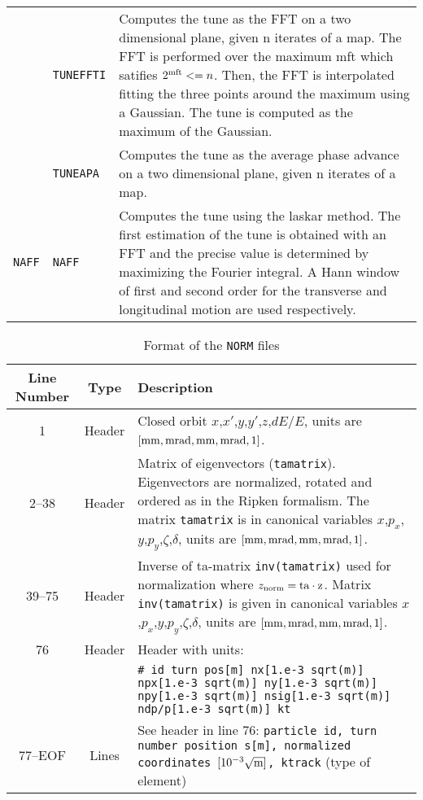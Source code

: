\begin{table}[H]
\begin{center}
\begin{tabularx}{\textwidth}{|l|l|X|}
    \cline{2-3}
    & \texttt{TUNEFFTI} & Computes the tune as the FFT on a two dimensional plane, given n iterates of a map. The FFT is performed over the maximum mft which satifies $2^{\rm mft} <= n$. Then, the FFT is interpolated fitting the three points around the maximum using a Gaussian. The tune is computed as the maximum of the Gaussian.\\
    \cline{2-3}
    & \texttt{TUNEAPA} & Computes the tune as the average phase advance on a two dimensional plane, given n iterates of a map. \\
    \hline
    \texttt{NAFF} \cite{NAFFpaper, NAFFpaper2}
    & \texttt{NAFF} & Computes the tune using the laskar method. The first estimation of the tune is obtained with an FFT and the precise value is determined by maximizing the Fourier integral. A Hann window of first and second order for the transverse and longitudinal motion are used respectively\index{NAFF}. \\
    \hline
    \end{tabularx}
\end{center}
\end{table}

\begin{table}[H]
\begin{center}
    \caption{Format of the \texttt{NORM} files}\label{fma:tab:2}
    \begin{tabularx}{\textwidth}{|c|c|X|}
        \hline
        \rowcolor{blue!30}
        \textbf{Line Number} & \textbf{Type} & \textbf{Description} \\
        \hline
        1 & Header & Closed orbit  $x$,$x'$,$y$,$y'$,$z$,$dE/E$, units are $[\rm mm,mrad,mm,mrad,1]$. \\
        \hline
        2--38 & Header & Matrix of eigenvectors (\texttt{tamatrix}). Eigenvectors are normalized, rotated and ordered as in the Ripken formalism. The matrix \texttt{tamatrix} is in canonical variables $x$,$p_x$,$y$,$p_y$,$\zeta$,$\delta$, units are $[\rm mm,mrad,mm,mrad,1]$. \\
        \hline
        39--75 & Header & Inverse of ta-matrix \texttt{inv(tamatrix)} used for normalization where \hbox{$z_{\rm norm}=\rm{ta}\cdot z$}. Matrix \texttt{inv(tamatrix)} is given in canonical variables $x$,$p_x$,$y$,$p_y$,$\zeta$,$\delta$, units are $[\rm mm,mrad,mm,mrad,1]$.\\
        \hline
        76 & Header & Header with units:\\
        &  & \texttt{\# id turn pos[m] nx[1.e-3 sqrt(m)] npx[1.e-3 sqrt(m)] ny[1.e-3 sqrt(m)] npy[1.e-3 sqrt(m)] nsig[1.e-3 sqrt(m)] ndp/p[1.e-3 sqrt(m)] kt} \\
        \hline
        77--EOF & Lines & See header in line 76: \texttt{particle id, turn number position s[m], normalized coordinates $[10^{-3} \sqrt{\rm m}]$, ktrack} (type of element)\\
        \hline
    \end{tabularx}
\end{center}
\end{table}

